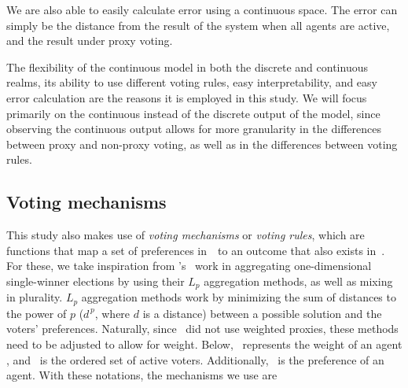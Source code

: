 We are also able to easily calculate error using a continuous space.
The error can simply be the distance from the result of the system when all agents
are active, and the result under proxy voting.

The flexibility of the continuous model in both the discrete and continuous realms, its
ability to use different voting rules, easy interpretability, and easy error
calculation are the reasons it is employed in this study.
We will focus primarily on the continuous instead of the discrete output of the
model, since observing the continuous output allows for more granularity in the
differences between proxy and non-proxy voting, as well as in the differences between
voting rules.

\subsection{Voting mechanisms}\label{subsec:voting-mechanisms}
This study also makes use of \textit{voting mechanisms} or \textit{voting rules},
which are functions that map a set of preferences in~\systemspace\ to an outcome that
also exists in~\systemspace.
For these, we take inspiration from 's~\cite{Bulteau2021} work in
aggregating one-dimensional single-winner elections by using their $L_p$ aggregation
methods, as well as mixing in plurality.
$L_p$ aggregation methods work by minimizing the sum of distances to the power of $p$
($d^{\,p}$, where $d$ is a distance) between a possible solution and the voters'
preferences.
Naturally, since~\cite{Bulteau2021} did not use weighted proxies, these methods need
to be adjusted to allow for weight.
Below, \agentweight\ represents the weight of an agent \agent, and \systemproxies\ is
the ordered set of active voters.
Additionally, \agenttruth\ is the preference of an agent.
With these notations, the mechanisms we use are
